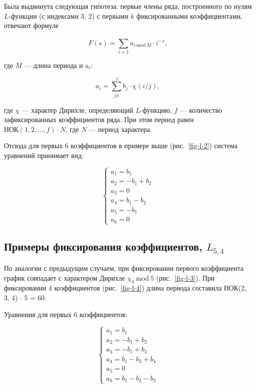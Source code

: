 \documentclass[intlimits,twoside,a4paper,11pt]{article}
\begin{document}
    
 

    Была выдвинута следующая гипотеза: первые члены ряда, построенного по нулям $L$-функции (с индексами 3, 2) с первыми
    $k$ фиксированными коэффициентами, отвечают формуле

    \begin{equation}
        F(s) = \sum_{i=1}^{}{a_{i\ \mathrm{mod}\ M}\cdot i^{-s}},
    \end{equation}

    где $M$ --- длина периода и $a_i$:

    \begin{equation}
        a_i=\sum_{j|i}^{f}{b_j \cdot \chi(i/j)},
    \end{equation}

    где $\chi$ --- характер Дирихле, определяющий $L$-функцию, $f$ --- количество 
    зафиксированных коэффициентов ряда. При этом период равен $\mathrm{НОК}(1,2,\dots,f)\cdot N$, где $N$ --- период характера. 

    Отсюда для первых 6 коэффициентов в примере выше (рис.~\ref{fig-l-2}) система уравнений принимает вид:

    \begin{equation}
        \begin{cases}
            a_{1} = b_1 \\
            a_{2} = -b_1 + b_2 \\
            a_{3} = 0 \\
            a_{4} = b_1 - b_2 \\
            a_{5} = -b_1 \\
            a_{6} = 0
        \end{cases}
    \end{equation}

    \subsection{Примеры фиксирования коэффициентов, $L_{5, 4}$}

    По аналогии с предыдущим случаем, при фиксировании первого коэффициента график совпадает с характером
    Дирихле $\chi_4\ \mathrm{mod}\ 5$  (рис.~\ref{fig-l-3}). При фиксировании 4 коэффициентов (рис.~\ref{fig-l-4}) длина периода составила
    НОК(2, 3, 4) $\cdot$ 5 = 60.

     
 

    Уравнения для первых 6 коэффициентов:

    \begin{equation}
        \begin{cases}
            a_{1} = b_1 \\
            a_{2} = -b_1 + b_2 \\
            a_{3} = -b_1 + b_3 \\
            a_{4} = b_1 - b_2 + b_4 \\
            a_{5} = 0 \\
            a_{6} = b_1 - b_2 - b_3
        \end{cases}
    \end{equation}
    
\end{document}
